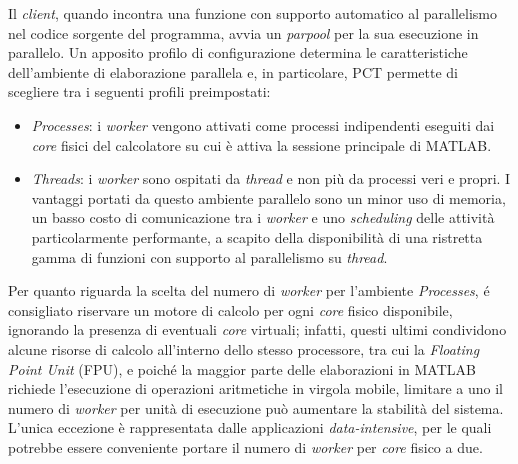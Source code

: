 Il \textit{client}, quando incontra una funzione con supporto automatico al parallelismo nel codice sorgente del programma, avvia un \textit{parpool} per la sua esecuzione in parallelo. \newline
Un apposito profilo di configurazione determina le caratteristiche dell'ambiente di elaborazione parallela e, in particolare, PCT permette di scegliere tra i seguenti profili preimpostati:
\begin{itemize}
    \item \textit{Processes}: i \textit{worker} vengono attivati come processi indipendenti eseguiti dai \textit{core} fisici del calcolatore su cui \`e attiva la sessione principale di MATLAB.
    \item \textit{Threads}: i \textit{worker} sono ospitati da \textit{thread} e non pi\`u da processi veri e propri. I vantaggi portati da questo ambiente parallelo sono un minor uso di memoria, un basso costo di comunicazione tra i \textit{worker} e uno \textit{scheduling} delle attivit\`a particolarmente performante, a scapito della disponibilit\`a di una ristretta gamma di funzioni con supporto al parallelismo su \textit{thread}.
\end{itemize}
Per quanto riguarda la scelta del numero di \textit{worker} per l'ambiente \textit{Processes}, \'e consigliato riservare un motore di calcolo per ogni \textit{core} fisico disponibile, ignorando la presenza di eventuali \textit{core} virtuali; infatti, questi ultimi condividono alcune risorse di calcolo all'interno dello stesso processore, tra cui la \textit{Floating Point Unit} (FPU), e poich\'e la maggior parte delle elaborazioni in MATLAB richiede l'esecuzione di operazioni aritmetiche in virgola mobile, limitare a uno il numero di \textit{worker} per unit\`a di esecuzione pu\`o aumentare la stabilit\`a del sistema. \newline 
L'unica eccezione \`e rappresentata dalle applicazioni \textit{data-intensive}, per le quali potrebbe essere conveniente portare il numero di \textit{worker} per \textit{core} fisico a due.


